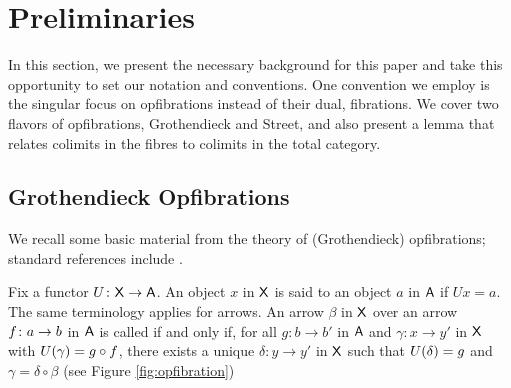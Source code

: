 \documentclass{amsart}
\begin{document}






\section{Preliminaries}\label{sec:preliminaries}

In this section, we present the necessary background for this paper
and take this opportunity to set our notation and conventions. One
convention we employ is the singular focus on opfibrations instead of
their dual, fibrations.  We cover two flavors of opfibrations,
Grothendieck and Street, and also present a lemma that relates
colimits in the fibres to colimits in the total category.

\subsection*{Grothendieck Opfibrations} %

We recall some basic material from the theory of (Grothendieck) opfibrations; standard references include \cite{Handbook2,Grayfibredandcofibred,hermidaphd}. 

Fix a functor $U \colon\mathsf{X} \to \mathsf{A}$. An object $x$ in $\mathsf{X}$ is said to
 an object $a$ in $\mathsf{A}$ if $Ux=a$. The same terminology
applies for arrows. An arrow $\beta$ in $\mathsf{X} $ over an arrow
$f \colon a \to b$ in $\mathsf{A}$ is called  if and only
if, for all $g \colon b \to b'$ in $\mathsf{A}$ and $\gamma \colon x\to y'$ in
$\mathsf{X} $ with $U(\gamma) = g\circ f$, there exists a unique
$\delta \colon y\to y'$ in $\mathsf{X}$ such that $U(\delta) = g$ and
$\gamma = \delta \circ \beta$ (see Figure \ref{fig:opfibration})
\begin{figure} 
\end{figure}
\end{document}
